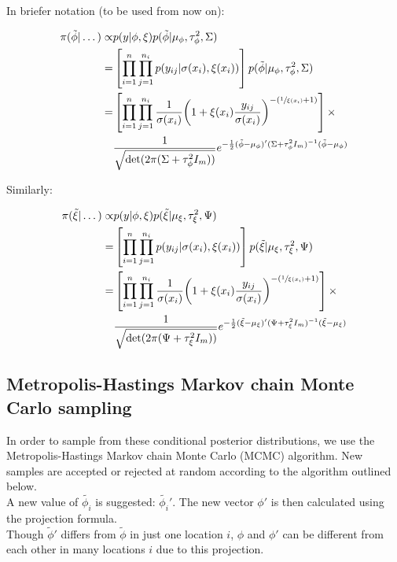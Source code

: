 \documentclass{article}
\begin{document}
In briefer notation (to be used from now on):

\begin{align*}
\pi(\tilde{\phi} | \dots ) \propto & p(y | \phi, \xi)  p(\tilde{\phi} | \mu_\phi, \tau^2_\phi, \Sigma) \\
= & \left[ \prod_{i=1}^n \prod_{j=1}^{n_i} p(y_{ij} | \sigma(x_i), \xi(x_i)) \right] p(\tilde{\phi} | \mu_\phi, \tau^2_\phi, \Sigma) \\
= & \left[ \prod_{i=1}^n \prod_{j=1}^{n_i} \frac{1}{\sigma(x_i)} \bigg( 1 + \xi(x_i) \frac{y_{ij}}{\sigma(x_i)} \bigg)^{-(\sfrac{1}{\xi(x_i)} + 1)} \right] \times \\
& \frac{1}{\sqrt{\det(2 \pi (\Sigma + \tau^2_\phi I_m))}} e^{-\frac{1}{2} (\tilde{\phi} - \mu_\phi)' (\Sigma + \tau^2_\phi I_m)^{-1} (\tilde{\phi} - \mu_\phi) }
\end{align*}

Similarly:

\begin{align*}
\pi(\tilde{\xi} | \dots ) \propto & p(y | \phi, \xi)  p(\tilde{\xi} | \mu_\xi, \tau^2_\xi, \Psi) \\
= & \left[ \prod_{i=1}^n \prod_{j=1}^{n_i} p(y_{ij} | \sigma(x_i), \xi(x_i)) \right] p(\tilde{\xi} | \mu_\xi, \tau^2_\xi, \Psi) \\
= & \left[ \prod_{i=1}^n \prod_{j=1}^{n_i} \frac{1}{\sigma(x_i)} \bigg( 1 + \xi(x_i) \frac{y_{ij}}{\sigma(x_i)} \bigg)^{-(\sfrac{1}{\xi(x_i)} + 1)} \right] \times \\
& \frac{1}{\sqrt{\det(2 \pi (\Psi + \tau^2_\xi I_m))}} e^{-\frac{1}{2} (\tilde{\xi} - \mu_\xi)' (\Psi + \tau^2_\xi I_m)^{-1} (\tilde{\xi} - \mu_\xi) }
\end{align*}

\subsection{Metropolis-Hastings Markov chain Monte Carlo sampling}

In order to sample from these conditional posterior distributions, we use the Metropolis-Hastings Markov chain Monte Carlo (MCMC) algorithm. New samples are accepted or rejected at random according to the algorithm outlined below. \\

A new value of $\tilde{\phi_i}$ is suggested: $\tilde{\phi_i}'$. The new vector $\phi'$ is then calculated using the projection formula. \\

Though $\tilde{\phi}'$ differs from $\tilde{\phi}$ in just one location $i$, $\phi$ and $\phi'$ can be different from each other in many locations $i$ due to this projection. \\
\end{document}
